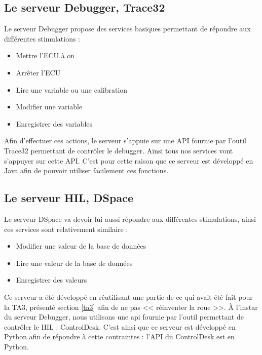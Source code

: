 	\subsection{Le serveur Debugger, Trace32}
	Le serveur Debugger propose des services basiques permettant de répondre aux différentes stimulations : 
	\begin{itemize}
		\item Mettre l'ECU à on
		\item Arrêter l'ECU
		\item Lire une variable ou une calibration
		\item Modifier une variable
		\item Enregistrer des variables
	\end{itemize}

	Afin d'effectuer ces actions, le serveur s'appuie sur une API fournie par l'outil Trace32 permettant de contrôler le debugger. Ainsi
	tous nos services vont s'appuyer sur cette API. C'est pour cette raison que ce serveur est développé en Java afin de pouvoir utiliser
	facilement ces fonctions.

	\subsection{Le serveur HIL, DSpace}
	Le serveur DSpace va devoir lui aussi répondre aux différentes stimulations, ainsi ces services sont relativement similaire : 
	\begin{itemize}
		\item Modifier une valeur de la base de données
		\item Lire une valeur de la base de données
		\item Enregistrer des valeurs
	\end{itemize}

	Ce serveur a été développé en réutilisant une partie de ce qui avait été fait pour la TA3, présenté section \ref{ta3} afin de ne pas
	<< réinventer la roue >>. À l'instar du serveur Debugger, nous utilisons une api fournie par l'outil permettant de contrôler le HIL : ControlDesk. 
	C'est ainsi que ce serveur est développé en Python afin de répondre à cette contraintes : l'API du ControlDesk est en Python.
	
